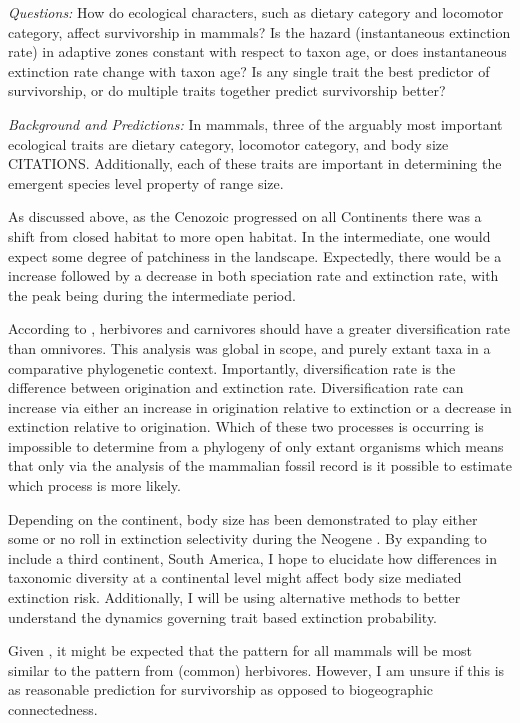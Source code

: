 \documentclass[12pt,letterpaper]{article}
\begin{document}
\textit{Questions:} How do ecological characters, such as dietary category and locomotor category, affect survivorship in mammals? Is the hazard (instantaneous extinction rate) in adaptive zones constant with respect to taxon age, or does instantaneous extinction rate change with taxon age? Is any single trait the best predictor of survivorship, or do multiple traits together predict survivorship better?

\textit{Background and Predictions:} 
In mammals, three of the arguably most important ecological traits are dietary category, locomotor category, and body size CITATIONS. Additionally, each of these traits are important in determining the emergent species level property of range size. 

As discussed above, as the Cenozoic progressed on all Continents there was a shift from closed habitat to more open habitat. In the intermediate, one would expect some degree of patchiness in the landscape. Expectedly, there would be a increase followed by a decrease in both speciation rate and extinction rate, with the peak being during the intermediate period.

According to \citet{Price2012}, herbivores and carnivores should have a greater diversification rate than omnivores. This analysis was global in scope, and purely extant taxa in a comparative phylogenetic context. Importantly, diversification rate is the difference between origination and extinction rate. Diversification rate can increase via either an increase in origination relative to extinction or a decrease in extinction relative to origination. Which of these two processes is occurring is impossible to determine from a phylogeny of only extant organisms \citep{Rabosky2010a} which means that only via the analysis of the mammalian fossil record is it possible to estimate which process is more likely. 

Depending on the continent, body size has been demonstrated to play either some or no roll in extinction selectivity during the Neogene \citep{Tomiya2013,Liow2008,Liow2009}. By expanding to include a third continent, South America, I hope to elucidate how differences in taxonomic diversity at a continental level might affect body size mediated extinction risk. Additionally, I will be using alternative methods to better understand the dynamics governing trait based extinction probability.

Given \citep{Jernvall2002}, it might be expected that the pattern for all mammals will be most similar to the pattern from (common) herbivores. However, I am unsure if this is as reasonable prediction for survivorship as opposed to biogeographic connectedness.
\end{document}
